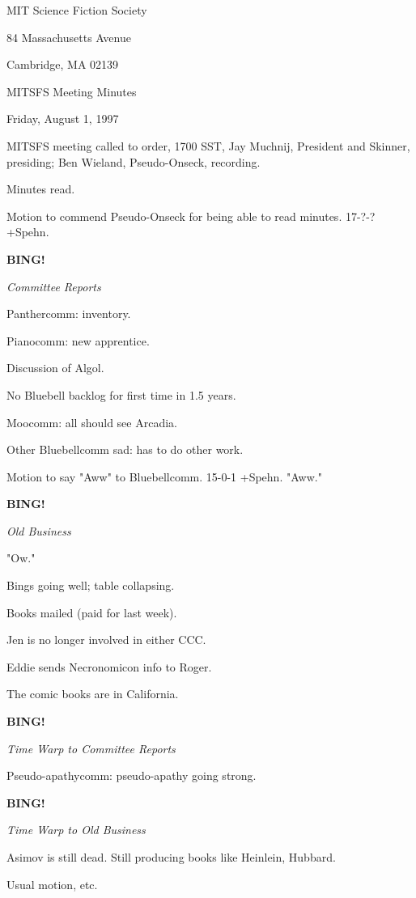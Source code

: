 \documentclass[12pt]{article}
\newcommand{\bing}{{\bf BING!} }
\newcommand{\goto}[1]{\bing \vskip 12pt \centerline{{\em{#1}}}}
\begin{document}
\begin{center}

MIT Science Fiction Society 

84 Massachusetts Avenue

Cambridge, MA 02139

\vspace{12pt}

MITSFS Meeting Minutes 

Friday, August 1, 1997

\end{center}
 
\vspace{18pt}

\setlength{\parskip}{6pt}

\noindent
MITSFS meeting called to order, 1700 SST,
Jay Muchnij, President and Skinner, presiding; Ben Wieland, Pseudo-Onseck, recording.

Minutes read.

Motion to commend Pseudo-Onseck for being able to read minutes. 17-?-? +Spehn.

\goto{Committee Reports}

Panthercomm: inventory.

Pianocomm: new apprentice.

Discussion of Algol.

No Bluebell backlog for first time in 1.5 years.

Moocomm: all should see Arcadia.

Other Bluebellcomm sad: has to do other work.

Motion to say "Aww" to Bluebellcomm. 15-0-1 +Spehn. "Aww."

\goto{Old Business}

"Ow."

Bings going well; table collapsing.

Books mailed (paid for last week).

Jen is no longer involved in either CCC.

Eddie sends Necronomicon info to Roger.

The comic books are in California.

\goto{Time Warp to Committee Reports}

Pseudo-apathycomm: pseudo-apathy going strong.

\goto{Time Warp to Old Business}

Asimov is still dead. Still producing books like Heinlein, Hubbard.

Usual motion, etc.
\end{document}
